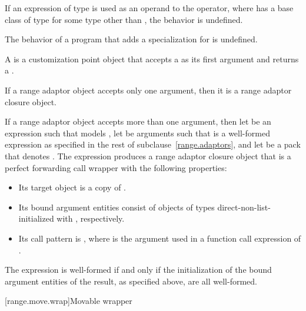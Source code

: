 \pnum
If an expression of type \cv{} 
is used as an operand to the \tcode{|} operator,
where  has a base class of type 
for some type  other than , the behavior is undefined.

\pnum
The behavior of a program
that adds a specialization for  is undefined.

\pnum
A  is a
customization point object
that accepts a  as its first argument and returns a
.

\pnum
If a range adaptor object accepts only one argument,
then it is a range adaptor closure object.

\pnum
If a range adaptor object  accepts more than one argument,
then let  be an expression
such that  models ,
let  be arguments
such that  is a well-formed expression
as specified in the rest of subclause~\ref{range.adaptors}, and
let  be a pack
that denotes .
The expression  produces a range adaptor closure object 
that is a perfect forwarding call wrapper with the following properties:
\begin{itemize}
\item
Its target object is a copy of .
\item
Its bound argument entities  consist of objects of types  direct-non-list-initialized with , respectively.
\item
Its call pattern is ,
where  is the argument used in a function call expression of .
\end{itemize}
The expression  is well-formed if and only if
the initialization of the bound argument entities of the result,
as specified above, are all well-formed.

[range.move.wrap]{Movable wrapper}

